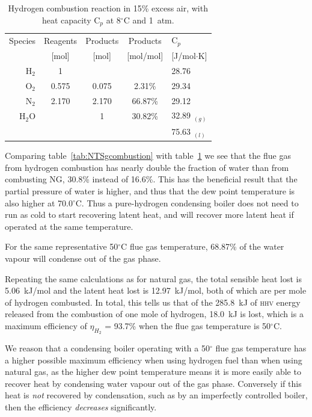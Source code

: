 \documentclass[5p]{elsarticle} %
\begin{document}
\begin{table}[ht]
    \centering
    \begin{tabular}{r|ccc|l}
         Species & Reagents & Products & Products & C$_p$\\
         & {\small[mol]} & {\small[mol]} & {\small[mol/mol]}&  {\small[J/mol$\cdot$K]}\\
         \hline
         H$_2$ & 1 & & & 28.76 \\
         O$_2$ & 0.575 & 0.075 & 2.31\% & 29.34 \\
         N$_2$ & 2.170 & 2.170 & 66.87\% & 29.12 \\
         H$_2$O & & 1 & 30.82\% & 32.89 $_{(g)}$ \\
         & &  &  & 75.63 $_{(l)}$ \\
    \end{tabular}
    \caption{Hydrogen combustion reaction in 15\% excess air, with heat capacity C$_p$\citep{Huber2022} at 8$^\circ$C and 1~atm.}
    \label{tab:hydrogencombustion}
\end{table}

Comparing table~\ref{tab:NTSgcombustion} with table~\ref{tab:hydrogencombustion} we see that the flue gas from hydrogen combustion has nearly double the fraction of water than from combusting NG, 30.8\% instead of 16.6\%.
This has the beneficial result that the partial pressure of water is higher, and thus that the dew point temperature is also higher at 70.0$^\circ$C.
Thus a pure-hydrogen condensing boiler does not need to run as cold to start recovering latent heat, and will recover more latent heat if operated at the same temperature.

For the same representative 50$^\circ$C flue gas temperature, 68.87\% of the water vapour will condense out of the gas phase. 

Repeating the same calculations as for natural gas, the total sensible heat lost is 5.06~kJ/mol and the latent heat lost is 12.97~kJ/mol, both of which are per mole of hydrogen combusted.
In total, this tells us that of the 285.8~kJ of \textsc{hhv} energy released from the combustion of one mole of hydrogen, 18.0~kJ is lost, which is a maximum efficiency of $\eta_{H_2}$ = 93.7\% when the flue gas temperature is 50$^{\circ}$C.

We reason that a condensing boiler operating with a 50$^\circ$ flue gas temperature has a higher possible maximum efficiency when using hydrogen fuel than when using natural gas, as the higher dew point temperature means it is more easily able to recover heat by condensing water vapour out of the gas phase.
Conversely if this heat is \emph{not} recovered by condensation, such as by an imperfectly controlled boiler, then the efficiency \emph{decreases} significantly.
\end{document}
